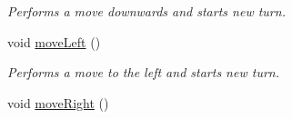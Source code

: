 \begin{DoxyCompactItemize}
\begin{DoxyCompactList}\small\item\em Performs a move downwards and starts new turn. \end{DoxyCompactList}\item 
\hypertarget{class_nulocks_1_1_core_1_1_board_a53c7b1172b6600be19f86cba2cdeb571}{void \hyperlink{class_nulocks_1_1_core_1_1_board_a53c7b1172b6600be19f86cba2cdeb571}{move\-Left} ()}\label{class_nulocks_1_1_core_1_1_board_a53c7b1172b6600be19f86cba2cdeb571}

\begin{DoxyCompactList}\small\item\em Performs a move to the left and starts new turn. \end{DoxyCompactList}\item 
\hypertarget{class_nulocks_1_1_core_1_1_board_a83294c8ca3e94e9409aad507ed81c78b}{void \hyperlink{class_nulocks_1_1_core_1_1_board_a83294c8ca3e94e9409aad507ed81c78b}{move\-Right} ()}\label{class_nulocks_1_1_core_1_1_board_a83294c8ca3e94e9409aad507ed81c78b}


\end{DoxyCompactItemize}
